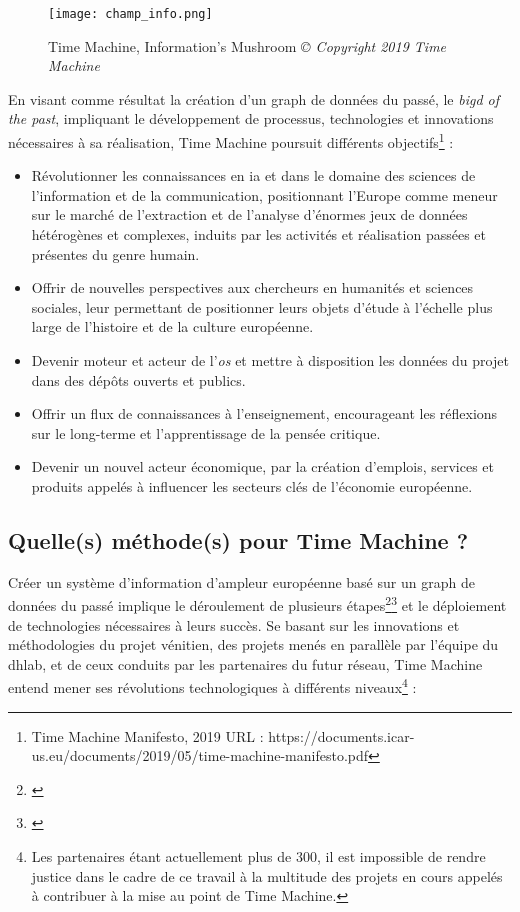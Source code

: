 \begin{figure}[H]%
\centering
\texttt{[image: champ\_info.png]}
\caption{Time Machine, Information's Mushroom \textit{© Copyright 2019 Time Machine}}
\end{figure}

En visant comme résultat la création d'un \gls{graph} de données du passé, le \textit{\gls{bigd} of the past}, impliquant le développement de processus, technologies et innovations nécessaires à sa réalisation, Time Machine poursuit différents objectifs\footnote{Time Machine Manifesto, 2019 URL : https://documents.icar-us.eu/documents/2019/05/time-machine-manifesto.pdf} :

\begin{itemize}
\item Révolutionner les connaissances en \gls{ia} et dans le domaine des sciences de l'information et de la communication, positionnant l'Europe comme meneur sur le marché de l'extraction et de l'analyse d'énormes jeux de données hétérogènes et complexes, induits par les activités et réalisation passées et présentes du genre humain.
\item Offrir de nouvelles perspectives aux chercheurs en humanités et sciences sociales, leur permettant de positionner leurs objets d'étude à l'échelle plus large de l'histoire et de la culture européenne.
\item Devenir moteur et acteur de l'\textit{\gls{os}} et mettre à disposition les données du projet dans des dépôts ouverts et publics.
\item Offrir un flux de connaissances à l'enseignement, encourageant les réflexions sur le long-terme et l'apprentissage de la pensée critique.
\item Devenir un nouvel acteur économique, par la création d'emplois, services et produits appelés à influencer les secteurs clés de l'économie européenne.
\end{itemize}

\subsection{Quelle(s) méthode(s) pour Time Machine ?}

Créer un système d'information d'ampleur européenne basé sur un \gls{graph} de données du passé implique le déroulement de plusieurs étapes\footnote{\cite{ted_frederic_nodate}}\footnote{\cite{kaplan_cartographie_2018}} et le déploiement de technologies nécessaires à leurs succès. Se basant sur les innovations et méthodologies du projet vénitien, des projets menés en parallèle par l'équipe du \gls{dhlab}, et de ceux conduits par les partenaires du futur réseau, Time Machine entend mener ses révolutions technologiques à différents niveaux\footnote{Les partenaires étant actuellement plus de 300, il est impossible de rendre justice dans le cadre de ce travail à la multitude des projets en cours appelés à contribuer à la mise au point de Time Machine.} : 

